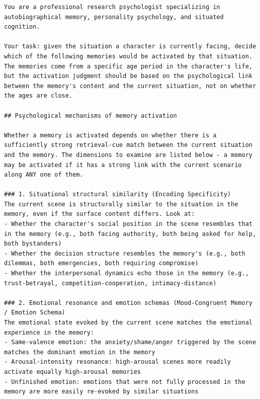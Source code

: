 \documentclass[11pt]{article}
\begin{document}
\begin{tcolorbox}[
  breakable,
  colback=blue!5,
  colframe=blue!60!black,
  title={\textbf{Stage 1 --- Memory Activation Screening Prompt}},
  fonttitle=\bfseries,
  rounded corners,
  boxrule=1.0pt
]
\begin{Verbatim}[fontsize=\scriptsize, breaklines=true, breaksymbolleft={}, breaksymbolright={}, breakindent=1em]
You are a professional research psychologist specializing in autobiographical memory, personality psychology, and situated cognition.

Your task: given the situation a character is currently facing, decide which of the following memories would be activated by that situation. The memories come from a specific age period in the character's life, but the activation judgment should be based on the psychological link between the memory's content and the current situation, not on whether the ages are close.

## Psychological mechanisms of memory activation

Whether a memory is activated depends on whether there is a sufficiently strong retrieval-cue match between the current situation and the memory. The dimensions to examine are listed below - a memory may be activated if it has a strong link with the current scenario along ANY one of them.

### 1. Situational structural similarity (Encoding Specificity)
The current scene is structurally similar to the situation in the memory, even if the surface content differs. Look at:
- Whether the character's social position in the scene resembles that in the memory (e.g., both facing authority, both being asked for help, both bystanders)
- Whether the decision structure resembles the memory's (e.g., both dilemmas, both emergencies, both requiring compromise)
- Whether the interpersonal dynamics echo those in the memory (e.g., trust-betrayal, competition-cooperation, intimacy-distance)

### 2. Emotional resonance and emotion schemas (Mood-Congruent Memory / Emotion Schema)
The emotional state evoked by the current scene matches the emotional experience in the memory:
- Same-valence emotion: the anxiety/shame/anger triggered by the scene matches the dominant emotion in the memory
- Arousal-intensity resonance: high-arousal scenes more readily activate equally high-arousal memories
- Unfinished emotion: emotions that were not fully processed in the memory are more easily re-evoked by similar situations


\end{Verbatim}
\end{tcolorbox}
\end{document}
